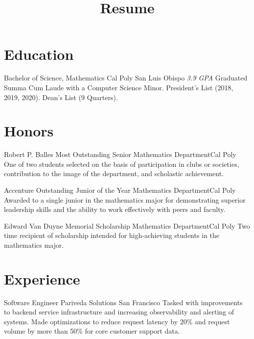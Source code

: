 \documentclass[letterpaper, 11pt, sans]{moderncv}
\title{Resume}
\begin{document}
\makecvtitle

\section{Education}
        {Bachelor of Science, Mathematics}
        {Cal Poly}
        {San Luis Obispo}
        {\textit{3.9 GPA}}
        {
            Graduated Summa Cum Laude with a Computer Science Minor.\newline
            President's List (2018, 2019, 2020). Dean's List (9 Quarters).
        }

\section{Honors}

        {Robert P. Balles Most Outstanding Senior}
        {Mathematics Department}{Cal Poly}{}
        {One of two students selected on the basis of participation in clubs or societies, contribution to the image of the department, and scholastic achievement.\newline}

        {Accenture Outstanding Junior of the Year}
        {Mathematics Department}{Cal Poly}{}
        {Awarded to a single junior in the mathematics major for demonstrating superior leadership skills and the ability to work effectively with peers and faculty.\newline}

        {Edward Van Duyne Memorial Scholarship}
        {Mathematics Department}{Cal Poly}{}
        {Two time recipient of scholarship intended for high-achieving students in the mathematics major.}

\section{Experience}

        {Software Engineer}
        {Pariveda Solutions}
        {San Francisco}{}
        {
            Tasked with improvements to backend service infrastructure and increasing observability and alerting of systems.
            Made optimizations to reduce request latency by 20\% and request volume by more than 50\% for core customer support data.
        }
\end{document}
